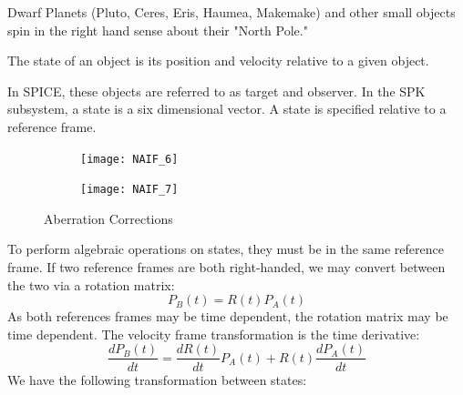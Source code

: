 \documentclass[crop=false,class=book]{standalone}
\begin{document}
\begin{remark}
Dwarf Planets (Pluto, Ceres, Eris, Haumea, Makemake) and other small objects spin in the right hand sense about their "North Pole."
\end{remark}
\begin{definition}
The state of an object is its position and velocity relative to a given object.
\end{definition}
\begin{remark}
In SPICE, these objects are referred to as target and observer. In the SPK subsystem, a state is a six dimensional vector. A state is specified relative to a reference frame.
\end{remark}
\begin{figure}[H]
    \centering
    \begin{subfigure}[b]{0.49\textwidth}
        \centering
        \texttt{[image: NAIF\_6]}
    \end{subfigure}
    \begin{subfigure}[b]{0.49\textwidth}
        \centering
        \texttt{[image: NAIF\_7]}
    \end{subfigure}
    \caption{Aberration Corrections}
    \label{fig:naif_aberration_corrections}
\end{figure}
To perform algebraic operations on states, they must be in the same reference frame. If two reference frames are both right-handed, we may convert between the two via a rotation matrix:
\begin{equation}
P_{B}(t)=R(t)P_{A}(t)
\end{equation}
As both references frames may be time dependent, the rotation matrix may be time dependent. The velocity frame transformation is the time derivative:
\begin{equation}
\frac{dP_{B}(t)}{dt}=\frac{dR(t)}{dt}P_{A}(t)+R(t)\frac{dP_{A}(t)}{dt}
\end{equation}
We have the following transformation between states:
\end{document}

